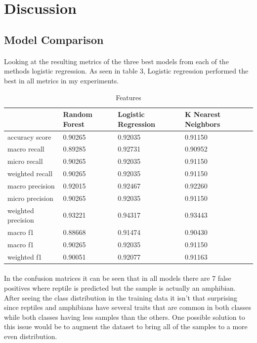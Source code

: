 \documentclass{article}
\begin{document}
\section{Discussion}
\subsection{Model Comparison}
\paragraph{}
    Looking at the resulting metrics of the three best models from each of the methods logistic regression. As seen in table 3, Logistic regression performed the best in all metrics in my experiments.
        \begin{table}[H]
      \caption{Features}
      \label{feature-table}
      \centering
      \begin{tabular}{llll}
        \cmidrule(r){1-2}
       & Random Forest & Logistic Regression & K Nearest Neighbors \\
        \midrule
        accuracy score      & 0.90265 & 0.92035 & 0.91150 \\
        macro recall        & 0.89285 & 0.92731 & 0.90952 \\
        micro recall        & 0.90265 & 0.92035 & 0.91150 \\
        weighted recall     & 0.90265 & 0.92035 & 0.91150 \\
        macro precision     & 0.92015 & 0.92467 & 0.92260 \\
        micro precision     & 0.90265 & 0.92035 & 0.91150 \\
        weighted precision  & 0.93221 & 0.94317 & 0.93443 \\
        macro f1            & 0.88668 & 0.91474 & 0.90430 \\
        macro f1            & 0.90265 & 0.92035 & 0.91150 \\
        weighted f1         & 0.90051 & 0.92077 & 0.91163 \\
        \bottomrule
      \end{tabular}
    \end{table}
\paragraph{}
    In the confusion matrices it can be seen that in all models there are 7 false positives where reptile is predicted but the sample is actually an amphibian. After seeing the class distribution in the training data it isn't that surprising since reptiles and amphibians have several traits that are common in both classes while both classes having less samples than the others. One possible solution to this issue would be to augment the dataset to bring all of the samples to a more even distribution.
\end{document}

